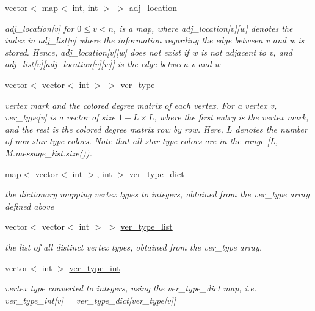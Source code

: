\begin{DoxyCompactItemize}
vector$<$ map$<$ int, int $>$ $>$ \hyperlink{classcolored__graph_ad657e7e86bee874d19dbc1765e1edaa7}{adj\+\_\+location}
\begin{DoxyCompactList}\small\item\em adj\+\_\+location\mbox{[}v\mbox{]} for $0 \leq v < n$, is a map, where adj\+\_\+location\mbox{[}v\mbox{]}\mbox{[}w\mbox{]} denotes the index in adj\+\_\+list\mbox{[}v\mbox{]} where the information regarding the edge between v and w is stored. Hence, adj\+\_\+location\mbox{[}v\mbox{]}\mbox{[}w\mbox{]} does not exist if w is not adjacent to v, and adj\+\_\+list\mbox{[}v\mbox{]}\mbox{[}adj\+\_\+location\mbox{[}v\mbox{]}\mbox{[}w\mbox{]}\mbox{]} is the edge between v and w \end{DoxyCompactList}\item 
vector$<$ vector$<$ int $>$ $>$ \hyperlink{classcolored__graph_a2cc32e7146fa3319f83cfa940f5e1be4}{ver\+\_\+type}
\begin{DoxyCompactList}\small\item\em vertex mark and the colored degree matrix of each vertex. For a vertex v, ver\+\_\+type\mbox{[}v\mbox{]} is a vector of size $1 + L \times L$, where the first entry is the vertex mark, and the rest is the colored degree matrix row by row. Here, $L$ denotes the number of non star type colors. Note that all star type colors are in the range \mbox{[}L, M.\+message\+\_\+list.\+size()). \end{DoxyCompactList}\item 
map$<$ vector$<$ int $>$, int $>$ \hyperlink{classcolored__graph_aeb780762429ddac375799f4a45405712}{ver\+\_\+type\+\_\+dict}
\begin{DoxyCompactList}\small\item\em the dictionary mapping vertex types to integers, obtained from the ver\+\_\+type array defined above \end{DoxyCompactList}\item 
vector$<$ vector$<$ int $>$ $>$ \hyperlink{classcolored__graph_a3a1ae8abac458d20a2afb4aa48bbc956}{ver\+\_\+type\+\_\+list}
\begin{DoxyCompactList}\small\item\em the list of all distinct vertex types, obtained from the ver\+\_\+type array. \end{DoxyCompactList}\item 
vector$<$ int $>$ \hyperlink{classcolored__graph_a491ed2ea1a65118af02ec606c8d44c0a}{ver\+\_\+type\+\_\+int}
\begin{DoxyCompactList}\small\item\em vertex type converted to integers, using the ver\+\_\+type\+\_\+dict map, i.\+e. ver\+\_\+type\+\_\+int\mbox{[}v\mbox{]} = ver\+\_\+type\+\_\+dict\mbox{[}ver\+\_\+type\mbox{[}v\mbox{]}\mbox{]} \end{DoxyCompactList}\item 

\end{DoxyCompactItemize}
